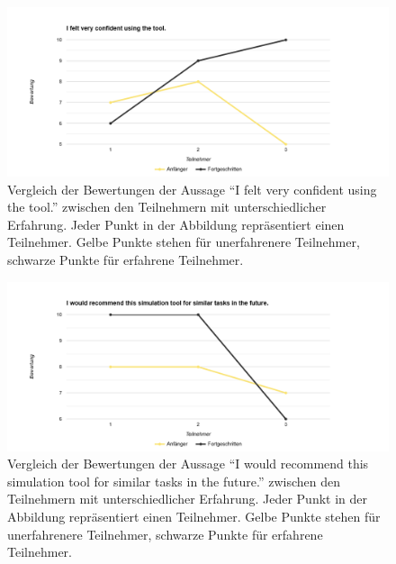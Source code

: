 \documentclass[german,version-2020-11]{uzl-thesis}
\begin{document}
  \begin{figure}[htpb]
    \centering
    \includegraphics[scale=0.4]{figures/group4.png}
    \caption{Vergleich der Bewertungen der Aussage ``I felt very confident using the tool.'' zwischen den Teilnehmern mit unterschiedlicher Erfahrung. 
              Jeder Punkt in der Abbildung repräsentiert einen Teilnehmer. Gelbe Punkte stehen für unerfahrenere Teilnehmer, schwarze Punkte für erfahrene Teilnehmer. }
    \label{fig-group4}
  \end{figure}

  \begin{figure}[htpb]
    \centering
    \includegraphics[scale=0.4]{figures/group5.png}
    \caption{Vergleich der Bewertungen der Aussage ``I would recommend this simulation tool for similar tasks in the future.'' zwischen den Teilnehmern mit unterschiedlicher Erfahrung. 
              Jeder Punkt in der Abbildung repräsentiert einen Teilnehmer. Gelbe Punkte stehen für unerfahrenere Teilnehmer, schwarze Punkte für erfahrene Teilnehmer. }
    \label{fig-group5}
  \end{figure}
\end{document}
